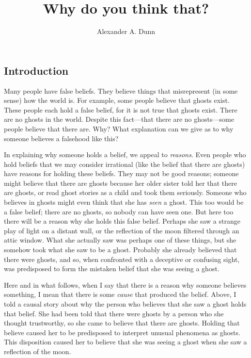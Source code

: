 \documentclass[11pt]{standalone}
\title{Why do you think that?}
\author{Alexander A. Dunn}
\newenvironment{inq}{\vspace{0pt}%
	\begin{list}{}%
	{\setlength\labelwidth{0pt}%
	\setlength\leftmargin{2.5\oddsidemargin}%
	\setlength\rightmargin{\leftmargin}}
	\begin{spacing}{1}
	\item[]%
	}{
	\end{spacing}
	\end{list}
	\vspace{10pt}
	}
\begin{document}
\ifstandalone
\maketitle
\tableofcontents
\begin{spacing}{1.5}
\fi


\section{Introduction}
\label{intro-deny}
\noindent Many people have false beliefs.  They believe things that
misrepresent (in some sense) how the world is.  For example, some
people believe that ghosts exist.  These people each hold a false
belief, for it is not true that ghosts exist.  There are no ghosts in
the world.  Despite this fact---that there are no ghosts---some people
believe that there are.  Why?  What explanation can we give as to why
someone believes a falsehood like this?

In explaining why someone holds a belief, we appeal to {\em reasons}.
Even people who hold beliefs that we may consider irrational (like the
belief that there are ghosts) have reasons for holding these beliefs.
They may not be good reasons; someone might believe that there are
ghosts because her older sister told her that there are ghosts, or
read ghost stories as a child and took them seriously.  Someone who
believes in ghosts might even think that she has {\em seen} a ghost.
This too would be a false belief; there are no ghosts, so nobody can
have seen one.  But here too there will be a reason why she holds this
false belief.  Perhaps she saw a strange play of light on a distant
wall, or the reflection of the moon filtered through an attic window.
What she actually saw was perhaps one of these things, but she somehow
took what she saw to be a ghost.  Probably she already believed that
there were ghosts, and so, when confronted with a deceptive or
confusing sight, was predisposed to form the mistaken belief that she
was seeing a ghost.

Here and in what follows, when I say that there is a reason why
someone believes something, I mean that there is some {\em cause} that
produced the belief.  Above, I told a causal story about why the
person who believes that she saw a ghost holds that belief.  She had
been told that there were ghosts by a person who she thought
trustworthy, so she came to believe that there are ghosts.  Holding
that believe caused her to be predisposed to interpret unusual
phenomena as ghosts.  This disposition caused her to believe that she
was seeing a ghost when she saw a reflection of the moon.


\end{spacing}
\end{document}
